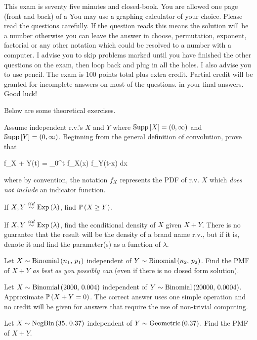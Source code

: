 \documentclass[12pt]{article}
\begin{document}
This exam is seventy five minutes and closed-book. You are allowed one page (front and back) of a  You may use a graphing calculator of your choice. Please read the questions carefully. If the question reads  this means the solution will be a number otherwise you can leave the answer in choose, permutation, exponent, factorial or any other notation which could be resolved to a number with a computer. I advise you to skip problems marked  until you have finished the other questions on the exam, then loop back and plug in all the holes. I also advise you to use pencil. The exam is 100 points total plus extra credit. Partial credit will be granted for incomplete answers on most of the questions.  in your final answers. Good luck!

\pagebreak

\problem Below are some theoretical exercises.


\benum
{}  Assume independent r.v.'s $X$ and $Y$ where $\mathbb{S}\text{upp}\left[X\right] = (0, \infty)$ and $\mathbb{S}\text{upp}\left[Y\right] = (0, \infty)$. Beginning from the general definition of convolution, prove that

\beqn
f_{X + Y}(t) =  \int\displaylimits_0^t f_X(x) f_Y(t-x) dx
\eeqn

where by convention, the notation $f_X$ represents the PDF of r.v. $X$ which \emph{does not include} an indicator function.

  If $X,Y \iid \exponential{\lambda}$, find $\mathbb{P}\left(X \geq Y\right)$. 

  If $X,Y \iid \exponential{\lambda}$, find the conditional density of $X$ given $X+Y$. There is no guarantee that the result will be the density of a brand name r.v., but if it is, denote it and find the parameter(s) as a function of $\lambda$. 


  Let $X \sim \mathrm{Binomial}\left(n_1,\,p_1\right)$ independent of $Y \sim \mathrm{Binomial}\left(n_2,\,p_2\right)$. Find the PMF of $X+Y$ \textit{as best as you possibly can} (even if there is no closed form solution). 

  Let $X \sim \mathrm{Binomial}\left(2000,\,0.004\right)$ independent of $Y \sim \mathrm{Binomial}\left(20000,\,0.0004\right)$. Approximate $\mathbb{P}\left(X + Y = 0\right)$. The correct answer uses one simple operation and no credit will be given for answers that require the use of non-trivial computing. 

  Let $X \sim \mathrm{NegBin}\left(35,\,0.37\right)$ independent of $Y \sim \mathrm{Geometric}\left(0.37\right)$. Find the PMF of $X + Y$. 
\end{document}
